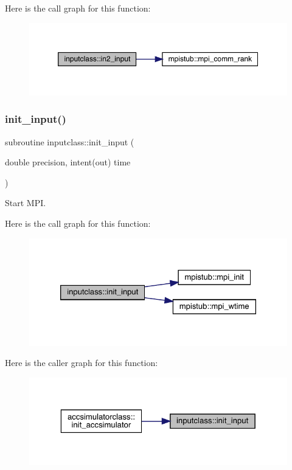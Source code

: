 Here is the call graph for this function\+:\nopagebreak
\begin{figure}[H]
\begin{center}
\leavevmode
\includegraphics[width=350pt]{namespaceinputclass_af94bb0662dc4e95990a7b13c1110d831_cgraph}
\end{center}
\end{figure}
\mbox{\label{namespaceinputclass_ae7866a50f5576b1fea0aa1b10f98690b}} 
\subsubsection{\texorpdfstring{init\_input()}{init\_input()}}
{\footnotesize\ttfamily subroutine inputclass\+::init\+\_\+input (\begin{DoxyParamCaption}\item[{double precision, intent(out)}]{time }\end{DoxyParamCaption})}



Start M\+PI. 

Here is the call graph for this function\+:\nopagebreak
\begin{figure}[H]
\begin{center}
\leavevmode
\includegraphics[width=326pt]{namespaceinputclass_ae7866a50f5576b1fea0aa1b10f98690b_cgraph}
\end{center}
\end{figure}
Here is the caller graph for this function\+:\nopagebreak
\begin{figure}[H]
\begin{center}
\leavevmode
\includegraphics[width=323pt]{namespaceinputclass_ae7866a50f5576b1fea0aa1b10f98690b_icgraph}
\end{center}
\end{figure}

